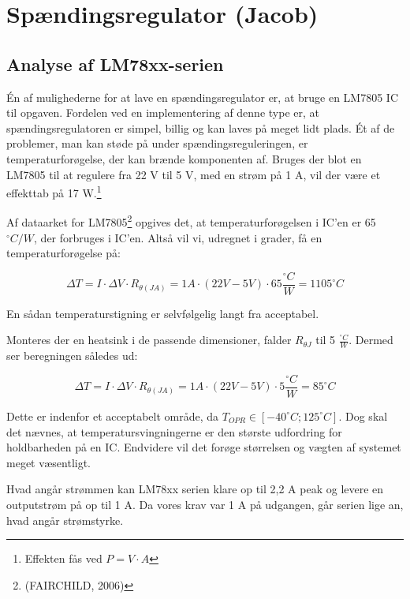 \section{Spændingsregulator (Jacob)}
\label{sec:spand-jacob}

\subsection{Analyse af LM78xx-serien}
\label{sec:analyse-af-lm78xx}

Én af mulighederne for at lave en spændingsregulator er, at bruge en LM7805 IC til opgaven. Fordelen ved en implementering af denne type er, at spændingsregulatoren er simpel, billig og kan laves på meget lidt plads. Ét af de problemer, man kan støde på under spændingsreguleringen, er temperaturforøgelse, der kan brænde komponenten af. Bruges der blot en LM7805 til at regulere fra 22 V til 5 V, med en strøm på 1 A, vil der være et effekttab på 17 W.\footnote{Effekten fås ved $P=V\cdot A$}

Af dataarket for LM7805\footnote{(FAIRCHILD, 2006)} opgives det, at temperaturforøgelsen i IC’en er 65 $^\circ C/W$, der forbruges i IC’en. Altså vil vi, udregnet i grader, få en temperaturforøgelse på:

\begin{equation}
  \label{eq:3}
  \Delta T = I \cdot \Delta V \cdot R_{\theta (JA)}=1 A \cdot (22V-5V)\cdot 65 \frac{^\circ C}{W} = 1105^\circ C
\end{equation}

En sådan temperaturstigning er selvfølgelig langt fra acceptabel.

Monteres der en heatsink i de passende dimensioner, falder $R_{\theta J}$ til 5 $\frac{^\circ C}{W}$. Dermed ser beregningen således ud: 

\begin{equation}
  \label{eq:3}
  \Delta T = I \cdot \Delta V \cdot R_{\theta (JA)}=1 A \cdot (22V-5V)\cdot 5 \frac{^\circ C}{W} = 85^\circ C
\end{equation}

Dette er indenfor et acceptabelt område, da $T_{OPR} \in  [-40 ^\circ C;125 ^\circ C]$. Dog skal det nævnes, at temperatursvingningerne er den største udfordring for holdbarheden på en IC. Endvidere vil det forøge størrelsen og vægten af systemet meget væsentligt.

Hvad angår strømmen kan LM78xx serien klare op til 2,2 A peak og levere en outputstrøm på op til 1 A. Da vores krav var 1 A på udgangen, går serien lige an, hvad angår strømstyrke.

